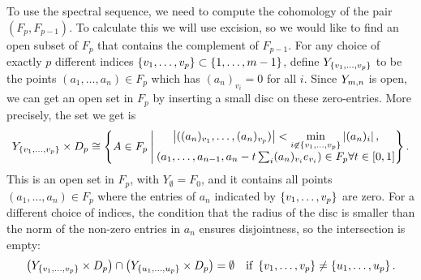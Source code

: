 To use the spectral sequence, we need to compute the cohomology of the
pair $(F_p,F_{p-1})$. To calculate this we will use excision, so we
would like to find an open subset of $F_p$ that contains the
complement of $F_{p-1}$. For any choice of exactly $p$ 
different indices $\left\{ v_1,\dots,v_p \right\}\subset \left\{ 1,\dots,m-1 \right\}$,
define $Y_{\left\{ v_1,\dots,v_p \right\}}$ to be the points $(a_1,\dots,a_n)\in
F_p$ which has $(a_n)_{v_i} = 0$ for all $i$. Since $Y_{m,n}$ is open, we
can get an open set in $F_p$ by inserting a small disc on these
zero-entries. More precisely, the set we get is
\[ Y_{\left\{ v_1,\dots,v_p \right\}} \times D_p \cong \left\{  A\in F_p \:\Bigg\vert\: 
  \begin{matrix} \displaystyle 
    \left| ((a_n)_{v_1},\dots,(a_n)_{v_p}) \right| <
    \min_{i\not\in \left\{ v_1,\dots,v_p \right\}} \left| (a_n)_i \right|, \\
    \left(a_1,\dots,a_{n-1},a_n-t\sum_{i} (a_n)_{v_i}e_{v_i}\right)\in
    F_p \forall t \in [0,1]
  \end{matrix}  \right\}. \]
This is an open set in $F_p$, with $Y_{\emptyset} = F_0$, and it
contains all points $(a_1,\dots,a_n)\in F_p$ where the entries of
$a_n$ indicated by $\left\{ v_1,\dots,v_p \right\}$ are zero. For a different
choice of indices, the condition that the radius of the disc is
smaller than the norm of the non-zero entries in $a_n$ ensures
disjointness, so the intersection is empty:
\[ \left(Y_{\left\{ v_1,\dots,v_p \right\}}\times D_p\right) \cap \left(
  Y_{\left\{ u_1,\dots,u_p \right\}}\times D_p\right) = \emptyset \quad \text{if }
\left\{ v_1,\dots,v_p \right\} \neq \left\{ u_1,\dots,u_p \right\}. \]

